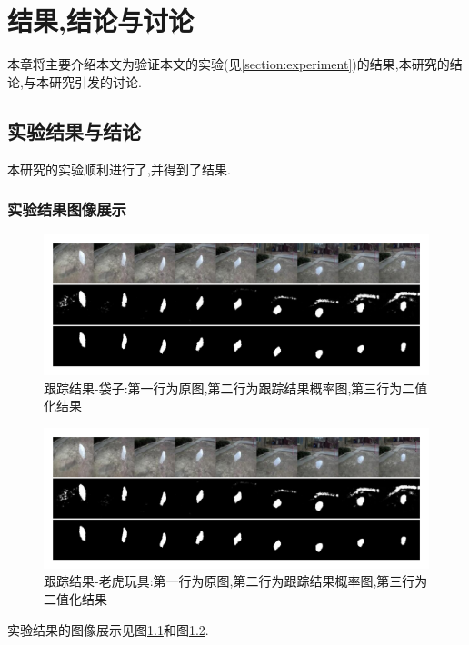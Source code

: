 
\chapter{结果,结论与讨论}
本章将主要介绍本文为验证本文的实验(见\ref{section:experiment})的结果,本研究的结论,与本研究引发的讨论.
\section{实验结果与结论}
本研究的实验顺利进行了,并得到了结果.
\subsection{实验结果图像展示}
\par
\begin{figure}
    \centering
    \includegraphics[width = 1.\textwidth]{chap/img/result_bag.pdf}
    \caption{跟踪结果-袋子:第一行为原图,第二行为跟踪结果概率图,第三行为二值化结果}
    \label{fig:result_bag}
\end{figure}
\par
\begin{figure}
    \centering
    \includegraphics[width = 1.\textwidth]{chap/img/result_bag.pdf}
    \caption{跟踪结果-老虎玩具:第一行为原图,第二行为跟踪结果概率图,第三行为二值化结果}
    \label{fig:result_tiger}
\end{figure}
\par
实验结果的图像展示见图\ref{fig:result_bag}和图\ref{fig:result_tiger}.
\par
